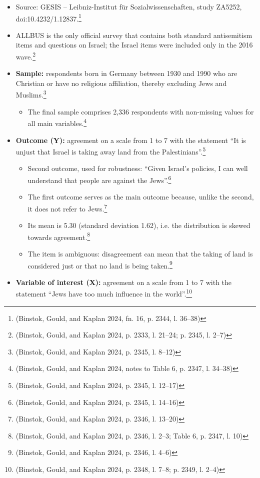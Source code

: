\begin{itemize}
\item
  Source: GESIS -- Leibniz-Institut für Sozialwissenschaften, study ZA5252, doi:10.4232/1.12837.\footnote{(Binstok, Gould, and Kaplan 2024, fn. 16, p. 2344, l. 36--38)}
\item
  ALLBUS is the only official survey that contains both standard antisemitism items and questions on Israel; the Israel items were included only in the 2016 wave.\footnote{(Binstok, Gould, and Kaplan 2024, p. 2333, l. 21--24; p. 2345, l. 2--7)}
\item
  \textbf{Sample:} respondents born in Germany between 1930 and 1990 who are Christian or have no religious affiliation, thereby excluding Jews and Muslims.\footnote{(Binstok, Gould, and Kaplan 2024, p. 2345, l. 8--12)}

  \begin{itemize}
  \item
    The final sample comprises 2,336 respondents with non-missing values for all main variables.\footnote{(Binstok, Gould, and Kaplan 2024, notes to Table 6, p. 2347, l. 34--38)}
  \end{itemize}
\item
  \textbf{Outcome (Y):} agreement on a scale from 1 to 7 with the statement ``It is unjust that Israel is taking away land from the Palestinians''.\footnote{(Binstok, Gould, and Kaplan 2024, p. 2345, l. 12--17)}

  \begin{itemize}
  \item
    Second outcome, used for robustness: ``Given Israel's policies, I can well understand that people are against the Jews''.\footnote{(Binstok, Gould, and Kaplan 2024, p. 2345, l. 14--16)}
  \item
    The first outcome serves as the main outcome because, unlike the second, it does not refer to Jews.\footnote{(Binstok, Gould, and Kaplan 2024, p. 2346, l. 13--20)}
  \item
    Its mean is 5.30 (standard deviation 1.62), i.e. the distribution is skewed towards agreement.\footnote{(Binstok, Gould, and Kaplan 2024, p. 2346, l. 2--3; Table 6, p. 2347, l. 10)}
  \item
    The item is ambiguous: disagreement can mean that the taking of land is considered just or that no land is being taken.\footnote{(Binstok, Gould, and Kaplan 2024, p. 2346, l. 4--6)}
  \end{itemize}
\item
  \textbf{Variable of interest (X):} agreement on a scale from 1 to 7 with the statement ``Jews have too much influence in the world''.\footnote{(Binstok, Gould, and Kaplan 2024, p. 2348, l. 7--8; p. 2349, l. 2--4)}


\end{itemize}
